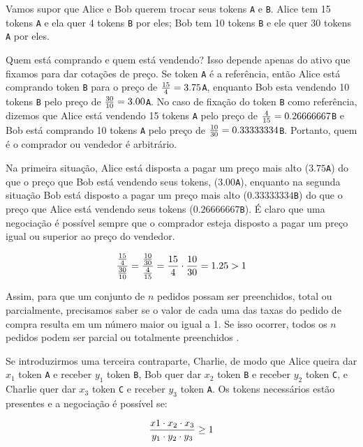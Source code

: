 \documentclass[UTF8,nofonts]{article}
\begin{document}
\begin{multicols}{2}
Vamos supor que Alice e Bob querem trocar seus tokens \verb|A| e \verb|B|. Alice tem 15 tokens \verb|A| e ela quer 4 tokens \verb|B| por eles; Bob tem 10 tokens \verb|B| e ele quer 30 tokens \verb|A| por eles.

Quem está comprando e quem está vendendo? Isso depende apenas do ativo que fixamos para dar cotações de preço. Se token \verb|A| é a referência, então Alice está comprando token \verb|B| para o preço de ${15 \over 4} = 3.75$\verb|A|, enquanto Bob esta vendendo 10 tokens \verb|B| pelo preço de ${30 \over 10} = 3.00$\verb|A|. No caso de fixação do token \verb|B| como referência, dizemos que Alice está vendendo 15 tokens \verb|A| pelo preço de ${4\over 15}=0.26666667$\verb|B| e Bob está comprando 10 tokens \verb|A| pelo preço de ${10 \over 30}=0.33333334$\verb|B|. Portanto, quem é o comprador ou vendedor é arbitrário.

Na primeira situação, Alice está disposta a pagar um preço mais alto ($3.75$\verb|A|) do que o preço que Bob está vendendo seus tokens, ($3.00$\verb|A|), enquanto na segunda situação Bob está disposto a pagar um preço mais alto ($0.33333334$\verb|B|) do que o preço que Alice está vendendo seus tokens ($0.26666667$\verb|B|). É claro que uma negociação é possível sempre que o comprador esteja disposto a pagar um preço igual ou superior ao preço do vendedor.

\begin{equation}
{{15\over 4} \over {30\over 10}} = {{10\over 30} \over {4\over 15}}={15 \over 4} \cdot {10 \over 30} = 1.25 > 1
\end{equation}

Assim, para que um conjunto de $n$ pedidos possam ser preenchidos, total ou parcialmente, precisamos saber se o valor de cada uma das taxas do pedido de compra resulta em um número maior ou igual a 1. 
Se isso ocorrer, todos os $n$ pedidos podem ser parcial ou totalmente preenchidos \cite{supersymmetry}.

Se introduzirmos uma terceira contraparte, Charlie, de modo que Alice queira dar $x_1$ token \verb|A| e receber $y_1$ token \verb|B|, Bob quer dar $x_2$ token \verb|B| e receber $y_2$ token \verb|C|, e Charlie quer dar $x_3$ token \verb|C| e receber $y_3$ token \verb|A|. Os tokens necessários estão presentes e a negociação é possível se:

\begin{equation}
{{x1 \cdot x_2 \cdot x_3 \over y_1 \cdot y_2 \cdot y_3} \geq 1}
\end{equation}



\end{multicols}
\end{document}
